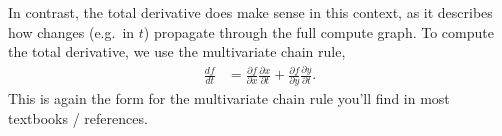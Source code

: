 \documentclass{article}
\newcommand{\dd}[2][]{\frac{\partial #1}{\partial #2}}
\newcommand{\dt}[2][]{\frac{d #1}{d #2}}
\begin{document}
In contrast, the total derivative does make sense in this context, as it describes how changes (e.g.\ in $t$) propagate through the full compute graph.
To compute the total derivative, we use the multivariate chain rule,
\begin{align}
  \dt[f]{t} &= \dd[f]{x} \dd[x]{t} + \dd[f]{y} \dd[y]{t}.
\end{align}
This is again the form for the multivariate chain rule you'll find in most textbooks / references.
%
%
\end{document}
